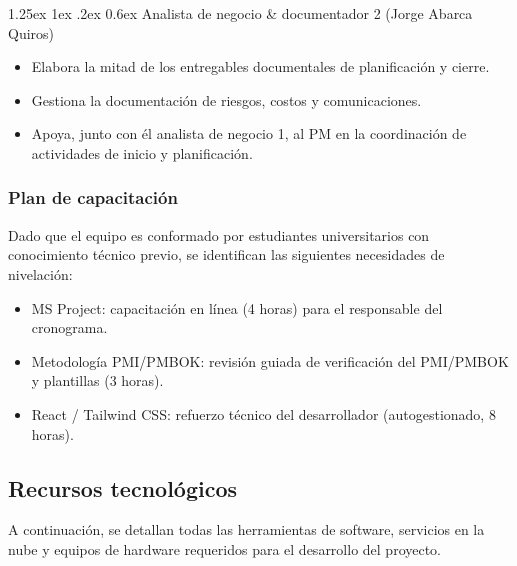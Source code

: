 \documentclass[11pt,spanish]{article}
\makeatletter
\renewcommand\paragraph{\@startsection{paragraph}{4}{\z@}%
  {1.25ex \@plus1ex \@minus.2ex}%
  {0.6ex}%
  {\normalfont\normalsize\bfseries}}
\makeatother
\begin{document}
\paragraph{Analista de negocio \& documentador 2 (Jorge Abarca Quiros)}

\begin{itemize}
    \item Elabora la mitad de los entregables documentales de planificación y cierre.
    \item Gestiona la documentación de riesgos, costos y comunicaciones.
    \item Apoya, junto con él analista de negocio 1, al PM en la coordinación de actividades de inicio y planificación.
\end{itemize}

\subsubsection{Plan de capacitación}

Dado que el equipo es conformado por estudiantes universitarios con conocimiento técnico previo, se identifican las siguientes necesidades de nivelación:

\begin{itemize}
    \item MS Project: capacitación en línea (4 horas) para el responsable del cronograma.
    \item Metodología PMI/PMBOK: revisión guiada de verificación del PMI/PMBOK y plantillas (3 horas).
    \item React / Tailwind CSS: refuerzo técnico del desarrollador (autogestionado, 8 horas).
\end{itemize}

\subsection{Recursos tecnológicos}

A continuación, se detallan todas las herramientas de software, servicios en la nube y equipos de hardware requeridos para el desarrollo del proyecto.
\end{document}
